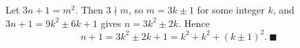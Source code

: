 Let $3n+1=m^2$. Then $3\nmid m$, so $m=3k\pm1$ for some integer $k$, and $3n+1=9k^2\pm6k+1$ gives $n=3k^2\pm2k$. Hence
\[n+1=3k^2\pm2k+1=k^2+k^2+(k\pm1)^2.\ \blacksquare\]
